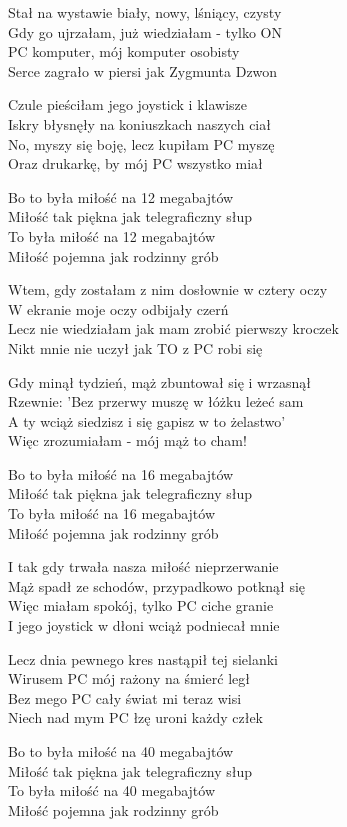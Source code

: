 \begin{text}
    Stał na wystawie biały, nowy, lśniący, czysty\\
    Gdy go ujrzałam, już wiedziałam - tylko ON\\
    PC komputer, mój komputer osobisty\\
    Serce zagrało w piersi jak Zygmunta Dzwon

    Czule pieściłam jego joystick i klawisze\\
    Iskry błysnęły na koniuszkach naszych ciał\\
    No, myszy się boję, lecz kupiłam PC myszę\\
    Oraz drukarkę, by mój PC wszystko miał

    Bo to była miłość na 12 megabajtów\\
    Miłość tak piękna jak telegraficzny słup\\
    To była miłość na 12 megabajtów\\
    Miłość pojemna jak rodzinny grób

    Wtem, gdy zostałam z nim dosłownie w cztery oczy\\
    W ekranie moje oczy odbijały czerń\\
    Lecz nie wiedziałam jak mam zrobić pierwszy kroczek\\
    Nikt mnie nie uczył jak TO z PC robi się

    Gdy minął tydzień, mąż zbuntował się i wrzasnął\\
    Rzewnie: 'Bez przerwy muszę w łóżku leżeć sam\\
    A ty wciąż siedzisz i się gapisz w to żelastwo'\\
    Więc zrozumiałam - mój mąż to cham!

    Bo to była miłość na 16 megabajtów\\
    Miłość tak piękna jak telegraficzny słup\\
    To była miłość na 16 megabajtów\\
    Miłość pojemna jak rodzinny grób

    I tak gdy trwała nasza miłość nieprzerwanie\\
    Mąż spadł ze schodów, przypadkowo potknął się\\
    Więc miałam spokój, tylko PC ciche granie\\
    I jego joystick w dłoni wciąż podniecał mnie

    Lecz dnia pewnego kres nastąpił tej sielanki\\
    Wirusem PC mój rażony na śmierć legł\\
    Bez mego PC cały świat mi teraz wisi\\
    Niech nad mym PC łzę uroni każdy człek

    Bo to była miłość na 40 megabajtów\\
    Miłość tak piękna jak telegraficzny słup\\
    To była miłość na 40 megabajtów\\
    Miłość pojemna jak rodzinny grób
\end{text}
\begin{chord}

\end{chord}